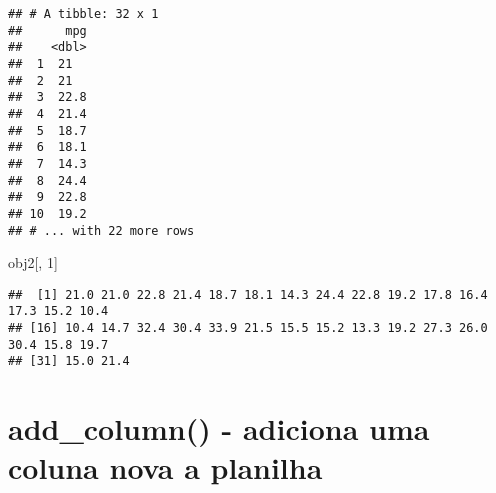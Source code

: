 \documentclass[]{book}
\newenvironment{Shaded}{\begin{snugshade}}{\end{snugshade}}
\newcommand{\CommentTok}[1]{\textcolor[rgb]{0.56,0.35,0.01}{\textit{#1}}}
\newcommand{\DataTypeTok}[1]{\textcolor[rgb]{0.13,0.29,0.53}{#1}}
\newcommand{\DecValTok}[1]{\textcolor[rgb]{0.00,0.00,0.81}{#1}}
\newcommand{\KeywordTok}[1]{\textcolor[rgb]{0.13,0.29,0.53}{\textbf{#1}}}
\newcommand{\NormalTok}[1]{#1}
\newcommand{\OperatorTok}[1]{\textcolor[rgb]{0.81,0.36,0.00}{\textbf{#1}}}
\newcommand{\StringTok}[1]{\textcolor[rgb]{0.31,0.60,0.02}{#1}}
\begin{document}
\begin{Shaded}
\end{Shaded}

\begin{verbatim}
## # A tibble: 32 x 1
##      mpg
##    <dbl>
##  1  21  
##  2  21  
##  3  22.8
##  4  21.4
##  5  18.7
##  6  18.1
##  7  14.3
##  8  24.4
##  9  22.8
## 10  19.2
## # ... with 22 more rows
\end{verbatim}

\begin{Shaded}
\begin{Highlighting}[]
\NormalTok{obj2[, }\DecValTok{1}\NormalTok{]}
\end{Highlighting}
\end{Shaded}

\begin{verbatim}
##  [1] 21.0 21.0 22.8 21.4 18.7 18.1 14.3 24.4 22.8 19.2 17.8 16.4 17.3 15.2 10.4
## [16] 10.4 14.7 32.4 30.4 33.9 21.5 15.5 15.2 13.3 19.2 27.3 26.0 30.4 15.8 19.7
## [31] 15.0 21.4
\end{verbatim}

\hypertarget{add_column---adiciona-uma-coluna-nova-a-planilha}{%
\section{add\_column() - adiciona uma coluna nova a planilha}\label{add_column---adiciona-uma-coluna-nova-a-planilha}}

\begin{Shaded}
\end{Shaded}
\end{document}
